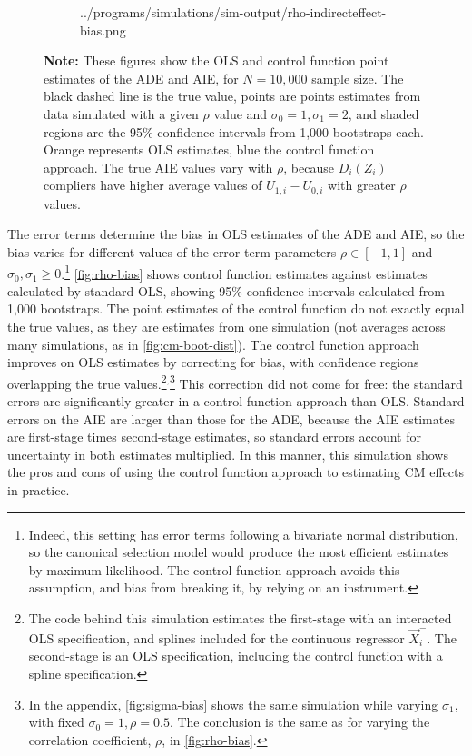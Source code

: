 \begin{figure}[h!]
\begin{subfigure}[c]{0.475\textwidth}
{            ../programs/simulations/sim-output/rho-indirecteffect-bias.png}
    \end{subfigure}
    \label{fig:rho-bias}
    \justify
    \footnotesize    
    \textbf{Note:}
    These figures show the OLS and control function point estimates of the ADE and AIE, for $N = 10,000$ sample size.
    The black dashed line is the true value, points are points estimates from data simulated with a given $\rho$ value and $\sigma_0 = 1, \sigma_1 = 2$, and shaded regions are the 95\% confidence intervals from 1,000 bootstraps each.
    Orange represents OLS estimates, blue the control function approach.
    The true AIE values vary with $\rho$, because $D_i(Z_i)$ compliers have higher average values of $U_{1,i} - U_{0,i}$ with greater $\rho$ values.
\end{figure}

The error terms determine the bias in OLS estimates of the ADE and AIE, so the bias varies for different values of the error-term parameters $\rho \in [-1, 1]$ and $\sigma_0, \sigma_1 \geq 0$.\footnote{
    Indeed, this setting has error terms following a bivariate normal distribution, so the canonical \cite{heckman1974shadow} selection model would produce the most efficient estimates by maximum likelihood.
    The control function approach avoids this assumption, and bias from breaking it, by relying on an instrument.
}
\autoref{fig:rho-bias} shows control function estimates against estimates calculated by standard OLS, showing 95\% confidence intervals calculated from 1,000 bootstraps.
The point estimates of the control function do not exactly equal the true values, as they are estimates from one simulation (not averages across many simulations, as in \autoref{fig:cm-boot-dist}).
The control function approach improves on OLS estimates by correcting for bias, with confidence regions overlapping the true values.\footnote{
    The code behind this simulation estimates the first-stage with an interacted OLS specification, and splines included for the continuous regressor $\vec X_i^-$.
    The second-stage is an OLS specification, including the control function with a spline specification.
}$^,$\footnote{
    In the appendix, \autoref{fig:sigma-bias} shows the same simulation while varying $\sigma_1$, with fixed $\sigma_0 = 1, \rho = 0.5$.
    The conclusion is the same as for varying the correlation coefficient, $\rho$, in \autoref{fig:rho-bias}.
}
This correction did not come for free: the standard errors are significantly greater in a control function approach than OLS.
Standard errors on the AIE are larger than those for the ADE, because the AIE estimates are first-stage times second-stage estimates, so standard errors account for uncertainty in both estimates multiplied.
In this manner, this simulation shows the pros and cons of using the control function approach to estimating CM effects in practice.
